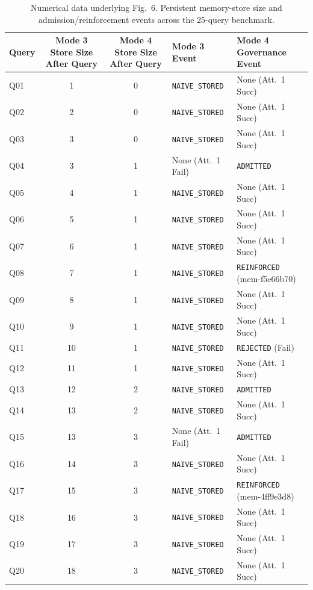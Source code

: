 \begin{table}[t]
\centering
\caption{Numerical data underlying Fig.~6. Persistent memory-store size and admission/reinforcement events across the 25-query benchmark.}
\label{tab:fig6_validation}
\setlength{\tabcolsep}{2.5pt}
\footnotesize
\begin{tabular}{lccll}
\toprule
\textbf{Query} & \textbf{Mode 3 Store Size After Query} & \textbf{Mode 4 Store Size After Query} & \textbf{Mode 3 Event} & \textbf{Mode 4 Governance Event} \\
\midrule
Q01 & 1 & 0 & \texttt{NAIVE\_STORED} & None (Att.~1 Succ) \\
Q02 & 2 & 0 & \texttt{NAIVE\_STORED} & None (Att.~1 Succ) \\
Q03 & 3 & 0 & \texttt{NAIVE\_STORED} & None (Att.~1 Succ) \\
Q04 & 3 & 1 & None (Att.~1 Fail) & \texttt{ADMITTED} \\
Q05 & 4 & 1 & \texttt{NAIVE\_STORED} & None (Att.~1 Succ) \\
Q06 & 5 & 1 & \texttt{NAIVE\_STORED} & None (Att.~1 Succ) \\
Q07 & 6 & 1 & \texttt{NAIVE\_STORED} & None (Att.~1 Succ) \\
Q08 & 7 & 1 & \texttt{NAIVE\_STORED} & \texttt{REINFORCED} (mem-f5e66b70) \\
Q09 & 8 & 1 & \texttt{NAIVE\_STORED} & None (Att.~1 Succ) \\
Q10 & 9 & 1 & \texttt{NAIVE\_STORED} & None (Att.~1 Succ) \\
Q11 & 10 & 1 & \texttt{NAIVE\_STORED} & \texttt{REJECTED} (Fail) \\
Q12 & 11 & 1 & \texttt{NAIVE\_STORED} & None (Att.~1 Succ) \\
Q13 & 12 & 2 & \texttt{NAIVE\_STORED} & \texttt{ADMITTED} \\
Q14 & 13 & 2 & \texttt{NAIVE\_STORED} & None (Att.~1 Succ) \\
Q15 & 13 & 3 & None (Att.~1 Fail) & \texttt{ADMITTED} \\
Q16 & 14 & 3 & \texttt{NAIVE\_STORED} & None (Att.~1 Succ) \\
Q17 & 15 & 3 & \texttt{NAIVE\_STORED} & \texttt{REINFORCED} (mem-4ff9e3d8) \\
Q18 & 16 & 3 & \texttt{NAIVE\_STORED} & None (Att.~1 Succ) \\
Q19 & 17 & 3 & \texttt{NAIVE\_STORED} & None (Att.~1 Succ) \\
Q20 & 18 & 3 & \texttt{NAIVE\_STORED} & None (Att.~1 Succ) \\

\end{tabular}
\end{table}

